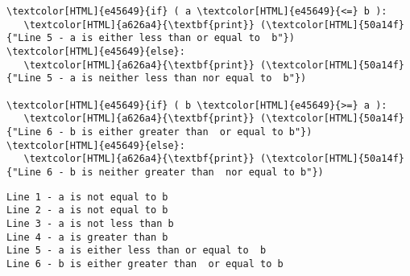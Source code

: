 \documentclass{scrartcl}
\begin{document}
\begin{Code}
\begin{Verbatim}[]
\textcolor[HTML]{e45649}{if} ( a \textcolor[HTML]{e45649}{<=} b ):
   \textcolor[HTML]{a626a4}{\textbf{print}} (\textcolor[HTML]{50a14f}{"Line 5 - a is either less than or equal to  b"})
\textcolor[HTML]{e45649}{else}:
   \textcolor[HTML]{a626a4}{\textbf{print}} (\textcolor[HTML]{50a14f}{"Line 5 - a is neither less than nor equal to  b"})

\textcolor[HTML]{e45649}{if} ( b \textcolor[HTML]{e45649}{>=} a ):
   \textcolor[HTML]{a626a4}{\textbf{print}} (\textcolor[HTML]{50a14f}{"Line 6 - b is either greater than  or equal to b"})
\textcolor[HTML]{e45649}{else}:
   \textcolor[HTML]{a626a4}{\textbf{print}} (\textcolor[HTML]{50a14f}{"Line 6 - b is neither greater than  nor equal to b"})
\end{Verbatim}
\end{Code}

\begin{verbatim}
Line 1 - a is not equal to b
Line 2 - a is not equal to b
Line 3 - a is not less than b
Line 4 - a is greater than b
Line 5 - a is either less than or equal to  b
Line 6 - b is either greater than  or equal to b
\end{verbatim}
\end{document}
